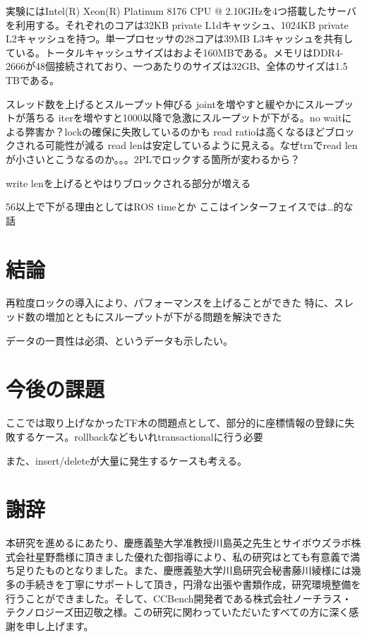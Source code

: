 \documentclass[a4paper]{jreport}	%
\begin{document}
実験にはIntel(R) Xeon(R) Platinum 8176 CPU @ 2.10GHzを4つ搭載したサーバを利用する。それぞれのコアは32KB private L1dキャッシュ、1024KB private L2キャッシュを持つ。単一プロセッサの28コアは39MB L3キャッシュを共有している。トータルキャッシュサイズはおよそ160MBである。メモリはDDR4-2666が48個接続されており、一つあたりのサイズは32GB、全体のサイズは1.5 TBである。




スレッド数を上げるとスループット伸びる
jointを増やすと緩やかにスループットが落ちる
iterを増やすと1000以降で急激にスループットが下がる。no waitによる弊害か？lockの確保に失敗しているのかも
read ratioは高くなるほどブロックされる可能性が減る
read lenは安定しているように見える。なぜtrnでread lenが小さいとこうなるのか。。。2PLでロックする箇所が変わるから？

write lenを上げるとやはりブロックされる部分が増える



56以上で下がる理由としてはROS timeとか
ここはインターフェイスでは…的な話


\chapter{結論}
再粒度ロックの導入により、パフォーマンスを上げることができた
特に、スレッド数の増加とともにスループットが下がる問題を解決できた

データの一貫性は必須、というデータも示したい。

\chapter{今後の課題}
ここでは取り上げなかったTF木の問題点として、部分的に座標情報の登録に失敗するケース。rollbackなどもいれtransactionalに行う必要

また、insert/deleteが大量に発生するケースも考える。


\chapter*{謝辞}

本研究を進めるにあたり、慶應義塾大学准教授川島英之先生とサイボウズラボ株式会社星野喬様に頂きました優れた御指導により、私の研究はとても有意義で満ち足りたものとなりました。また、慶應義塾大学川島研究会秘書藤川綾様には幾多の手続きを丁寧にサポートして頂き，円滑な出張や書類作成，研究環境整備を行うことができました。そして、CCBench開発者である株式会社ノーチラス・テクノロジーズ田辺敬之様。この研究に関わっていただいたすべての方に深く感謝を申し上げます。
\end{document}
